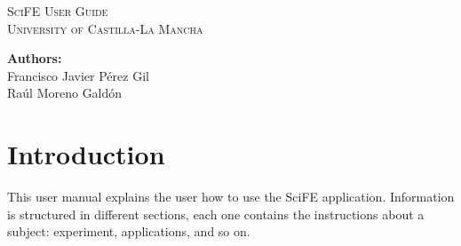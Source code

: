 \documentclass[11pt]{article}
\begin{document}
\thispagestyle{empty}
\begin{titlepage}
	\begin{center}
		\textsc{\Huge SciFE User Guide}
		\vspace*{0.5in}\\
		\huge{\textsc{University of Castilla-La Mancha}}
		\vspace*{0.6in}\\
		\begin{figure}[h!]
			\centering
			\hspace{.5cm}
		\end{figure}
		\vspace{0.6in}
		\huge{\textbf{Authors:}\\Francisco Javier P\'erez Gil\\Ra\'ul Moreno Gald\'on}
	\end{center}
\end{titlepage}
\newpage
\thispagestyle{empty}
\tableofcontents
\clearpage
\thispagestyle{empty}
\listoffigures
\clearpage
\setcounter{page}{1}

\section{Introduction}
This user manual explains the user how to use the SciFE application. Information is structured in different sections, each one contains the instructions about a subject: experiment, applications, and so on.
\end{document}
